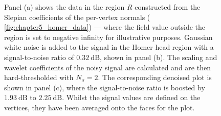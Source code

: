 \begin{figure}[htpb]
	\centering\capstart{}
	\hfill
	\hfill
	\caption[
		A denoising demonstration for a field on the Homer mesh
	]{
		Panel (a) shows the data in the region \(R\) constructed from the Slepian coefficients of the per-vertex normals (\cf{} \cref{fig:chapter5_homer_data}) --- where the field value outside the region is set to negative infinity for illustrative purposes.
		Gaussian white noise is added to the signal in the Homer head region with a signal-to-noise ratio of \(\SI{0.32}{\dB}\), shown in panel (b).
		The scaling and wavelet coefficients of the noisy signal are calculated and are then hard-thresholded with \(N_{\sigma}=2\).
		The corresponding denoised plot is shown in panel (c), where the signal-to-noise ratio is boosted by \(\SI{1.93}{\dB}\) to \(\SI{2.25}{\dB}\).
		Whilst the signal values are defined on the vertices, they have been averaged onto the faces for the plot.
	}\label{fig:chapter5_denoising}
\end{figure}
